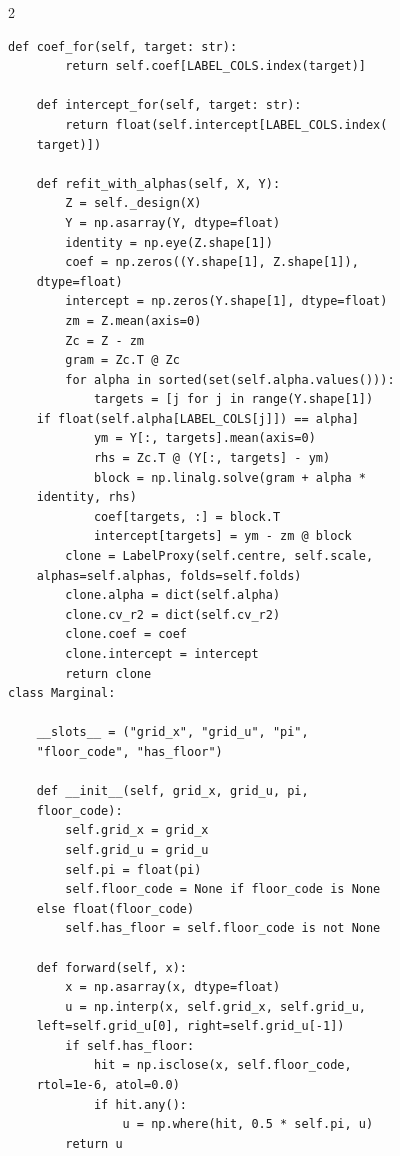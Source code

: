 \begin{multicols}{2}
\begin{Verbatim}[fontsize=\scriptsize]
    def coef_for(self, target: str):
        return self.coef[LABEL_COLS.index(target)]

    def intercept_for(self, target: str):
        return float(self.intercept[LABEL_COLS.index(
    target)])

    def refit_with_alphas(self, X, Y):
        Z = self._design(X)
        Y = np.asarray(Y, dtype=float)
        identity = np.eye(Z.shape[1])
        coef = np.zeros((Y.shape[1], Z.shape[1]),
    dtype=float)
        intercept = np.zeros(Y.shape[1], dtype=float)
        zm = Z.mean(axis=0)
        Zc = Z - zm
        gram = Zc.T @ Zc
        for alpha in sorted(set(self.alpha.values())):
            targets = [j for j in range(Y.shape[1])
    if float(self.alpha[LABEL_COLS[j]]) == alpha]
            ym = Y[:, targets].mean(axis=0)
            rhs = Zc.T @ (Y[:, targets] - ym)
            block = np.linalg.solve(gram + alpha *
    identity, rhs)
            coef[targets, :] = block.T
            intercept[targets] = ym - zm @ block
        clone = LabelProxy(self.centre, self.scale,
    alphas=self.alphas, folds=self.folds)
        clone.alpha = dict(self.alpha)
        clone.cv_r2 = dict(self.cv_r2)
        clone.coef = coef
        clone.intercept = intercept
        return clone
class Marginal:

    __slots__ = ("grid_x", "grid_u", "pi",
    "floor_code", "has_floor")

    def __init__(self, grid_x, grid_u, pi,
    floor_code):
        self.grid_x = grid_x
        self.grid_u = grid_u
        self.pi = float(pi)
        self.floor_code = None if floor_code is None
    else float(floor_code)
        self.has_floor = self.floor_code is not None

    def forward(self, x):
        x = np.asarray(x, dtype=float)
        u = np.interp(x, self.grid_x, self.grid_u,
    left=self.grid_u[0], right=self.grid_u[-1])
        if self.has_floor:
            hit = np.isclose(x, self.floor_code,
    rtol=1e-6, atol=0.0)
            if hit.any():
                u = np.where(hit, 0.5 * self.pi, u)
        return u


\end{Verbatim}
\end{multicols}
